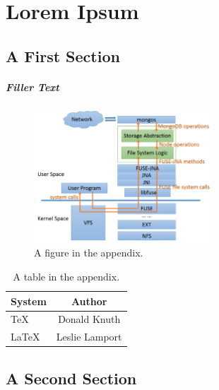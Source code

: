 \chapter{Lorem Ipsum}

\section{A First Section}

\paragraph{Filler Text} \lipsum[1-6]
%
\begin{figure}
  \centering
  \includegraphics[width=0.6\textwidth]{Chapter-3/figs/fig1.png}
  \caption{A figure in the appendix.}
  \label{fig:app}
\end{figure}
%
\lipsum[7-10]
\begin{table}
  \caption{A table in the appendix.}
  \label{tab:app}
  \begin{center}
    \begin{tabular}{lc}
      \toprule
      System & Author \\
      \midrule
      \TeX   & Donald Knuth   \\
      \LaTeX & Leslie Lamport \\
      \bottomrule
    \end{tabular}
  \end{center}
\end{table}
%

\section{A Second Section}

\lipsum[14-15]
